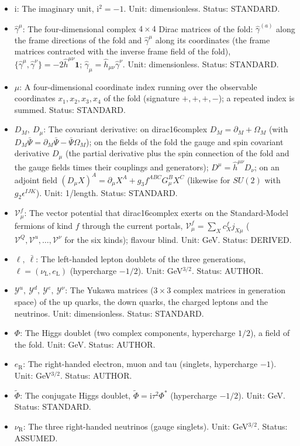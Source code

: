 \documentclass[
  10pt,
]{article}
\providecommand{\tightlist}{%
  \setlength{\itemsep}{0pt}\setlength{\parskip}{0pt}}
\begin{document}
\begin{itemize}
\tightlist
\item
  \(\mathrm{i}\): The imaginary unit, \(\mathrm{i}^2 = -1\). Unit:
  dimensionless. Status: STANDARD.
\item
  \(\hat\gamma^\mu\): The four-dimensional complex \(4 \times 4\) Dirac
  matrices of the fold: \(\hat\gamma^{(a)}\) along the frame directions
  of the fold and \(\hat\gamma^\mu\) along its coordinates (the frame
  matrices contracted with the inverse frame field of the fold),
  \(\{\hat\gamma^\mu, \hat\gamma^\nu\} = -2\hat h^{\mu\nu}\mathbf{1}\);
  \(\hat\gamma_\mu = \hat h_{\mu\nu}\hat\gamma^\nu\). Unit:
  dimensionless. Status: STANDARD.
\item
  \(\mu\): A four-dimensional coordinate index running over the
  observable coordinates \(x_1, x_2, x_3, x_4\) of the fold (signature
  \(+,+,+,-\)); a repeated index is summed. Status: STANDARD.
\item
  \(D_M,\ D_\mu\): The covariant derivative: on dirac16complex
  \(D_M = \partial_M + \Omega_M\) (with
  \(D_M\bar\Psi = \partial_M\bar\Psi - \bar\Psi\Omega_M\)); on the
  fields of the fold the gauge and spin covariant derivative \(D_\mu\)
  (the partial derivative plus the spin connection of the fold and the
  gauge fields times their couplings and generators);
  \(D^\mu = \hat h^{\mu\nu}D_\nu\); on an adjoint field
  \((D_\mu X)^A = \partial_\mu X^A + g_3f^{ABC}G^B_\mu X^C\) (likewise
  for \(SU(2)\) with \(g_2\epsilon^{IJK}\)). Unit: 1/length. Status:
  STANDARD.
\item
  \(\mathcal{V}^{f}_\mu\): The vector potential that dirac16complex
  exerts on the Standard-Model fermions of kind \(f\) through the
  current portals, \(\mathcal{V}^{f}_\mu = \sum_Xc^{f}_Xj_{X\mu}\)
  (\(\mathcal{V}^{Q}, \mathcal{V}^{u}, \dots, \mathcal{V}^{\nu}\) for
  the six kinds); flavour blind. Unit: GeV. Status: DERIVED.
\item
  \(\ell,\ \bar\ell\): The left-handed lepton doublets of the three
  generations, \(\ell = (\nu_{\mathrm{L}}, e_{\mathrm{L}})\)
  (hypercharge \(-1/2\)). Unit: GeV\(^{3/2}\). Status: AUTHOR.
\item
  \(\mathcal{Y}^{u},\ \mathcal{Y}^{d},\ \mathcal{Y}^{e},\ \mathcal{Y}^{\nu}\):
  The Yukawa matrices (\(3 \times 3\) complex matrices in generation
  space) of the up quarks, the down quarks, the charged leptons and the
  neutrinos. Unit: dimensionless. Status: STANDARD.
\item
  \(\Phi\): The Higgs doublet (two complex components, hypercharge
  \(1/2\)), a field of the fold. Unit: GeV. Status: AUTHOR.
\item
  \(e_{\mathrm{R}}\): The right-handed electron, muon and tau (singlets,
  hypercharge \(-1\)). Unit: GeV\(^{3/2}\). Status: AUTHOR.
\item
  \(\tilde\Phi\): The conjugate Higgs doublet,
  \(\tilde\Phi = \mathrm{i}\tau^2\Phi^*\) (hypercharge \(-1/2\)). Unit:
  GeV. Status: STANDARD.
\item
  \(\nu_{\mathrm{R}}\): The three right-handed neutrinos (gauge
  singlets). Unit: GeV\(^{3/2}\). Status: ASSUMED.
\end{itemize}
\end{document}
